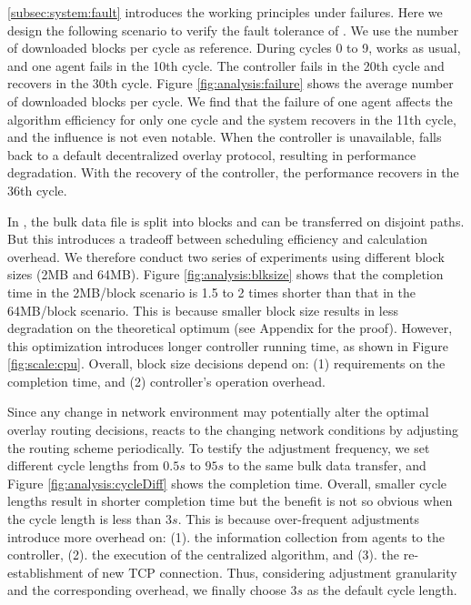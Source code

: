 
\Section\ref{subsec:system:fault} introduces the working principles under failures. Here we design the following scenario to verify the fault tolerance of \name. We use the number of downloaded blocks per cycle as reference. During cycles 0 to 9, \name works as usual, and one agent fails in the 10th cycle. The controller fails in the 20th cycle and recovers in the 30th cycle. Figure \ref{fig:analysis:failure} shows the average number of downloaded blocks per cycle. We find that the failure of one agent affects the algorithm efficiency for only one cycle and the system recovers in the 11th cycle, and the influence is not even notable. When the controller is unavailable, \name falls back to a default decentralized overlay protocol, resulting in performance degradation. With the recovery of the controller, the performance recovers in the 36th cycle.

\label{subsec:evaluation:benchmarks:parameters}

 In \name, the bulk data file is split into blocks and can be transferred on disjoint paths. But this introduces a tradeoff between scheduling efficiency and calculation overhead. We therefore conduct two series of experiments using different block sizes (2MB and 64MB). Figure \ref{fig:analysis:blksize} shows that the completion time in the 2MB/block scenario is 1.5 to 2 times shorter than that in the 64MB/block scenario. This is because smaller block size results in less degradation on the theoretical optimum (see Appendix for the proof). However, this optimization introduces longer controller running time, as shown in Figure \ref{fig:scale:cpu}. Overall, block size decisions depend on: (1) requirements on the completion time, and (2) controller's operation overhead.

 Since any change in network environment may potentially alter the optimal overlay routing decisions, \name reacts to the changing network conditions by adjusting the routing scheme periodically. To testify the adjustment frequency, we set different cycle lengths from $0.5s$ to $95s$ to the same bulk data transfer, and Figure \ref{fig:analysis:cycleDiff} shows the completion time. Overall, smaller cycle lengths result in shorter completion time but the benefit is not so obvious when the cycle length is less than $3s$. This is because over-frequent adjustments introduce more overhead on: (1). the information collection from agents to the controller, (2). the execution of the centralized algorithm, and (3). the re-establishment of new TCP connection. Thus, considering adjustment granularity and the corresponding overhead, we finally choose $3s$ as the default cycle length.


